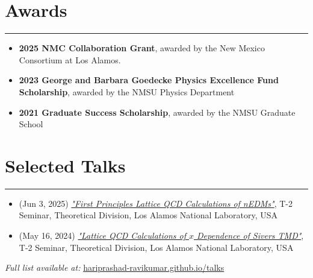 \documentclass[11pt]{article}
\begin{document}
\section*{Awards}
\hrule
\vspace{-0.3em}

\begin{itemize}
    \item \textbf{2025 NMC Collaboration Grant}, awarded by the New Mexico Consortium at Los Alamos.
    \vspace{-0.5em}
    \item \textbf{2023 George and Barbara Goedecke Physics Excellence Fund Scholarship}, awarded by the NMSU Physics Department
    \vspace{-0.5em}
    \item \textbf{2021 Graduate Success Scholarship}, awarded by the NMSU Graduate School
\end{itemize}

\section*{Selected Talks}
\hrule
\vspace{-0.3em}
\begin{itemize}
    \item (Jun 3, 2025) \href{https://hariprashad-ravikumar.github.io/talks/Los_Alamos_T2_talk_First_Principles_Lattice_QCD_Calculations_of_nEDMs__presentation_Hari_NMSU_June_03_2025.pdf}{\textit{"First Principles Lattice QCD Calculations of nEDMs"}}, T-2 Seminar, Theoretical Division, Los Alamos National Laboratory, USA

    
    \item (May 16, 2024) \href{https://hariprashad-ravikumar.github.io/talks/Lattice_QCD_calculations_of_Sivers_TMD_x_dependance____presentation_Hari__NMSU_May_16_2024.pdf}{\textit{"Lattice QCD Calculations of $x$ Dependence of Sivers TMD"}}, T-2 Seminar, Theoretical Division, Los Alamos National Laboratory, USA
    
\end{itemize}

\noindent\textit{Full list available at:} \href{https://hariprashad-ravikumar.github.io/talks}{hariprashad-ravikumar.github.io/talks}
\end{document}
